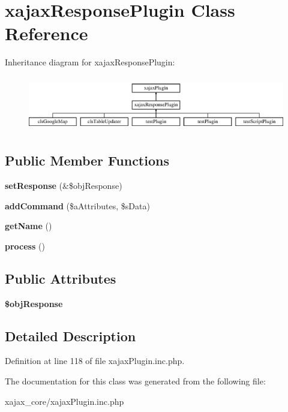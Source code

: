 \hypertarget{classxajaxResponsePlugin}{
\section{xajaxResponsePlugin Class Reference}
\label{classxajaxResponsePlugin}
}
Inheritance diagram for xajaxResponsePlugin:\begin{figure}[H]
\begin{center}
\leavevmode
\includegraphics[height=2.417266cm]{classxajaxResponsePlugin}
\end{center}
\end{figure}
\subsection*{Public Member Functions}
\begin{DoxyCompactItemize}
\item 
\hypertarget{classxajaxResponsePlugin_a5432e725738b13596365a633d9e92043}{
{\bfseries setResponse} (\&\$objResponse)}
\label{classxajaxResponsePlugin_a5432e725738b13596365a633d9e92043}

\item 
\hypertarget{classxajaxResponsePlugin_add6eb33c9f14837abb82c69586221594}{
{\bfseries addCommand} (\$aAttributes, \$sData)}
\label{classxajaxResponsePlugin_add6eb33c9f14837abb82c69586221594}

\item 
\hypertarget{classxajaxResponsePlugin_aa123350d10085a07d598856121c50cf6}{
{\bfseries getName} ()}
\label{classxajaxResponsePlugin_aa123350d10085a07d598856121c50cf6}

\item 
\hypertarget{classxajaxResponsePlugin_abb3561dbaa82222ac22a2f010ce241cd}{
{\bfseries process} ()}
\label{classxajaxResponsePlugin_abb3561dbaa82222ac22a2f010ce241cd}

\end{DoxyCompactItemize}
\subsection*{Public Attributes}
\begin{DoxyCompactItemize}
\item 
\hypertarget{classxajaxResponsePlugin_aba30adca435acfeff12c1946e88aaeef}{
{\bfseries \$objResponse}}
\label{classxajaxResponsePlugin_aba30adca435acfeff12c1946e88aaeef}

\end{DoxyCompactItemize}


\subsection{Detailed Description}


Definition at line 118 of file xajaxPlugin.inc.php.



The documentation for this class was generated from the following file:\begin{DoxyCompactItemize}
\item 
xajax\_\-core/xajaxPlugin.inc.php\end{DoxyCompactItemize}
